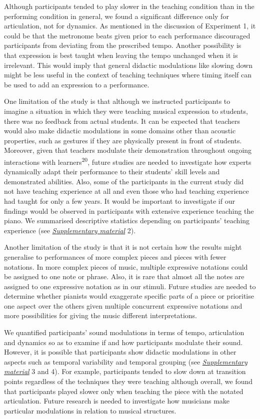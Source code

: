 \documentclass[
  man,floatsintext]{apa6}
\begin{document}
Although participants tended to play slower in the teaching condition than in the performing condition in general, we found a significant difference only for articulation, not for dynamics. As mentioned in the discussion of Experiment 1, it could be that the metronome beats given prior to each performance discouraged participants from deviating from the prescribed tempo. Another possibility is that expression is best taught when leaving the tempo unchanged when it is irrelevant. This would imply that general didactic modulations like slowing down might be less useful in the context of teaching techniques where timing itself can be used to add an expression to a performance.

One limitation of the study is that although we instructed participants to imagine a situation in which they were teaching musical expression to students, there was no feedback from actual students. It can be expected that teachers would also make didactic modulations in some domains other than acoustic properties, such as gestures if they are physically present in front of students. Moreover, given that teachers modulate their demonstration throughout ongoing interactions with learners\textsuperscript{20}, future studies are needed to investigate how experts dynamically adapt their performance to their students' skill levels and demonstrated abilities. Also, some of the participants in the current study did not have teaching experience at all and even those who had teaching experience had taught for only a few years. It would be important to investigate if our findings would be observed in participants with extensive experience teaching the piano. We summarised descriptive statistics depending on participants' teaching experience (see \emph{\protect\hyperlink{supplementary}{Supplementary material}} 2).

Another limitation of the study is that it is not certain how the results might generalise to performances of more complex pieces and pieces with fewer notations. In more complex pieces of music, multiple expressive notations could be assigned to one note or phrase. Also, it is rare that almost all the notes are assigned to one expressive notation as in our stimuli. Future studies are needed to determine whether pianists would exaggerate specific parts of a piece or prioritise one aspect over the others given multiple concurrent expressive notations and more possibilities for giving the music different interpretations.

We quantified participants' sound modulations in terms of tempo, articulation and dynamics so as to examine if and how participants modulate their sound. However, it is possible that participants show didactic modulations in other aspects such as temporal variability and temporal grouping (see \emph{\protect\hyperlink{supplementary}{Supplementary material}} 3 and 4). For example, participants tended to slow down at transition points regardless of the techniques they were teaching although overall, we found that participants played slower only when teaching the piece with the notated articulation. Future research is needed to investigate how musicians make particular modulations in relation to musical structures.
\end{document}
